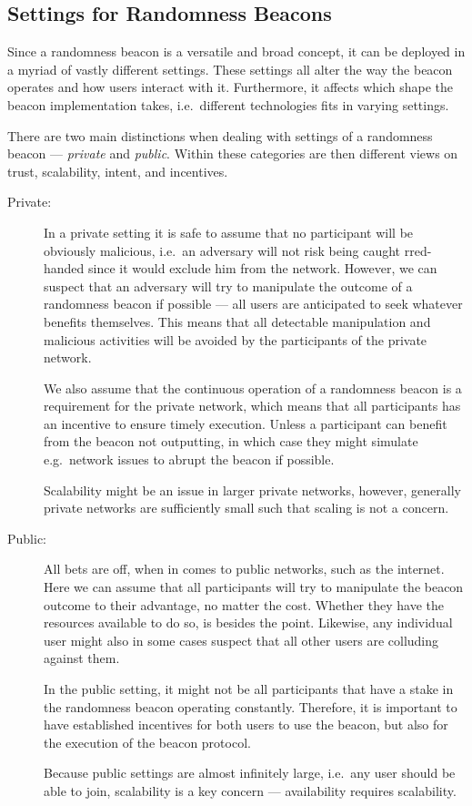 \subsection{Settings for Randomness Beacons}
Since a randomness beacon is a versatile and broad concept, it can be deployed in a myriad of vastly different settings.
These settings all alter the way the beacon operates and how users interact with it.
Furthermore, it affects which shape the beacon implementation takes, i.e.\ different technologies fits in varying settings.

There are two main distinctions when dealing with settings of a randomness beacon --- \emph{private} and \emph{public}.
Within these categories are then different views on trust, scalability, intent, and incentives.

\begin{description}
    \item[Private:]
        In a private setting it is safe to assume that no participant will be obviously malicious, i.e.\ an adversary will not risk being caught rred-handed since it would exclude him from the network.
        However, we can suspect that an adversary will try to manipulate the outcome of a randomness beacon if possible --- all users are anticipated to seek whatever benefits themselves.
        This means that all detectable manipulation and malicious activities will be avoided by the participants of the private network.

        We also assume that the continuous operation of a randomness beacon is a requirement for the private network, which means that all participants has an incentive to ensure timely execution.
        Unless a participant can benefit from the beacon not outputting, in which case they might simulate e.g.\ network issues to abrupt the beacon if possible.

        Scalability might be an issue in larger private networks, however, generally private networks are sufficiently small such that scaling is not a concern.
    \item[Public:]
        All bets are off, when in comes to public networks, such as the internet.
        Here we can assume that all participants will try to manipulate the beacon outcome to their advantage, no matter the cost.
        Whether they have the resources available to do so, is besides the point.
        Likewise, any individual user might also in some cases suspect that all other users are colluding against them.

        In the public setting, it might not be all participants that have a stake in the randomness beacon operating constantly.
        Therefore, it is important to have established incentives for both users to use the beacon, but also for the execution of the beacon protocol.

        Because public settings are almost infinitely large, i.e.\ any user should be able to join, scalability is a key concern --- availability requires scalability.
\end{description}


